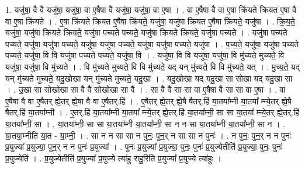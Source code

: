 \documentclass[17pt]{extarticle}
\begin{document}
1. यजु॑षा॒ वै वै यजु॑षा॒ यजु॑षा॒ वा ए॒षैषा वै यजु॑षा॒ यजु॑षा॒ वा ए॒षा । . वा ए॒षैषा वै वा ए॒षा क्रि॑यते क्रियत ए॒षा वै वा ए॒षा क्रि॑यते । . ए॒षा क्रि॑यते क्रियत ए॒षैषा क्रि॑यते॒ यजु॑षा॒ यजु॑षा क्रियत ए॒षैषा क्रि॑यते॒ यजु॑षा । . क्रि॒य॒ते॒ यजु॑षा॒ यजु॑षा क्रियते क्रियते॒ यजु॑षा पच्यते पच्यते॒ यजु॑षा क्रियते क्रियते॒ यजु॑षा पच्यते । . यजु॑षा पच्यते पच्यते॒ यजु॑षा॒ यजु॑षा पच्यते॒ यजु॑षा॒ यजु॑षा पच्यते॒ यजु॑षा॒ यजु॑षा पच्यते॒ यजु॑षा । . प॒च्य॒ते॒ यजु॑षा॒ यजु॑षा पच्यते पच्यते॒ यजु॑षा॒ वि वि यजु॑षा पच्यते पच्यते॒ यजु॑षा॒ वि । . यजु॑षा॒ वि वि यजु॑षा॒ यजु॑षा॒ वि मु॑च्यते मुच्यते॒ वि यजु॑षा॒ यजु॑षा॒ वि मु॑च्यते । . वि मु॑च्यते मुच्यते॒ वि वि मु॑च्यते॒ यद् यन् मु॑च्यते॒ वि वि मु॑च्यते॒ यत् । . मु॒च्य॒ते॒ यद् यन् मु॑च्यते मुच्यते॒ यदु॒खोखा यन् मु॑च्यते मुच्यते॒ यदु॒खा । . यदु॒खोखा यद् यदु॒खा सा सोखा यद् यदु॒खा सा । . उ॒खा सा सोखोखा सा वै वै सोखोखा सा वै । . सा वै वै सा सा वा ए॒षैषा वै सा सा वा ए॒षा । . वा ए॒षैषा वै वा ए॒षैतर्‌ ह्ये॒तर्‌ ह्ये॒षा वै वा ए॒षैतर्.हि॑ । . ए॒षैतर्‌ ह्ये॒तर् ह्ये॒षै षैतर्.हि॑ या॒तया᳚म्नी या॒तया᳚ म्न्ये॒तर् ह्ये॒षै षैतर्.हि॑ या॒तया᳚म्नी । . ए॒तर्.हि॑ या॒तया᳚म्नी या॒तया᳚ म्न्ये॒तर् ह्ये॒तर्.हि॑ या॒तया᳚म्नी॒ सा सा या॒तया᳚ म्न्ये॒तर् ह्ये॒तर्.हि॑ या॒तया᳚म्नी॒ सा । . या॒तया᳚म्नी॒ सा सा या॒तया᳚म्नी या॒तया᳚म्नी॒ सा न न सा या॒तया᳚म्नी या॒तया᳚म्नी॒ सा न । . या॒तया॒म्नीति॑ या॒त - या॒म्नी॒ । . सा न न सा सा न पुनः॒ पुन॒र् न सा सा न पुनः॑ । . न पुनः॒ पुन॒र् न न पुनः॑ प्र॒युज्या᳚ प्र॒युज्या॒ पुन॒र् न न पुनः॑ प्र॒युज्या᳚ । . पुनः॑ प्र॒युज्या᳚ प्र॒युज्या॒ पुनः॒ पुनः॑ प्र॒युज्येतीति॑ प्र॒युज्या॒ पुनः॒ पुनः॑ प्र॒युज्येति॑ । . प्र॒युज्येतीति॑ प्र॒युज्या᳚ प्र॒युज्ये त्या॑हु राहु॒रिति॑ प्र॒युज्या᳚ प्र॒युज्ये त्या॑हुः । \newline
\end{document}
